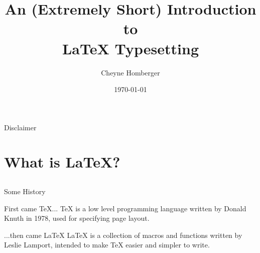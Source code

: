 \documentclass[xcolor=dvipsnames]{beamer}
\begin{document}
\title{\textrm{An (Extremely Short) Introduction to \\ \LaTeX{} Typesetting}}
\author{Cheyne Homberger}
\date{\today} %




\begin{frame}
  \maketitle %
\end{frame}


\begin{frame}{Disclaimer}

  \begin{center}
  \end{center}
\end{frame}



\begin{frame}
  \tableofcontents[hideallsubsections]
\end{frame}

\section{What is \LaTeX?}
\subsection{} %

\begin{frame}
\end{frame}



\begin{frame}{Some History}
  \begin{block}{First came \TeX{}...} %
    \TeX{} is a low level programming language written by Donald Knuth in 1978,
    used for specifying page layout.
  \end{block}
  \pause
  \begin{block}{...then came \LaTeX{}}
    \LaTeX{} is a collection of macros and functions written by Leslie Lamport,
    intended to make \TeX{} easier and simpler to write. 
  \end{block}
  \begin{center}
  \Large
  \end{center}
\end{frame}
\end{document}
